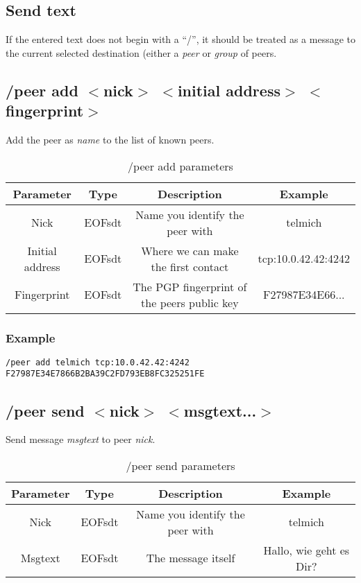 \documentclass[12pt,a4paper]{book}
\begin{document}
\subsection{Send text}
If the entered text does not begin with a "`/"', it should be treated
as a message to the current selected destination (either
a \emph{peer} or \emph{group} of peers.
\subsection{/peer add $<$nick$>$ $<$initial address$>$ $<$fingerprint$>$}
Add the peer as \textit{name} to the list of known peers.

%
\begin{longtable}{|c|c|c|c|}
\caption{/peer add parameters}\\
\hline
\textbf{Parameter} & \textbf{Type} & \textbf{Description} & \textbf{Example}\\
\hline
Nick & EOFsdt & Name you identify the peer with & telmich\\
\hline
Initial address & EOFsdt & Where we can make the first contact & tcp:10.0.42.42:4242\\
\hline
Fingerprint & EOFsdt & The PGP fingerprint of the peers public key & F27987E34E66...\\
\hline
\end{longtable}

\subsubsection{Example}
\begin{verbatim}
/peer add telmich tcp:10.0.42.42:4242 F27987E34E7866B2BA39C2FD793EB8FC325251FE
\end{verbatim}
\subsection{/peer send $<$nick$>$ $<$msgtext...$>$}
Send message \textit{msgtext} to peer \textit{nick}.

%
\begin{longtable}{|c|c|c|c|}
\caption{/peer send parameters}\\
\hline
\textbf{Parameter} & \textbf{Type} & \textbf{Description} & \textbf{Example}\\
\hline
Nick & EOFsdt & Name you identify the peer with & telmich\\
\hline
Msgtext & EOFsdt & The message itself & Hallo, wie geht es Dir?\\
\hline
\end{longtable}
\end{document}
